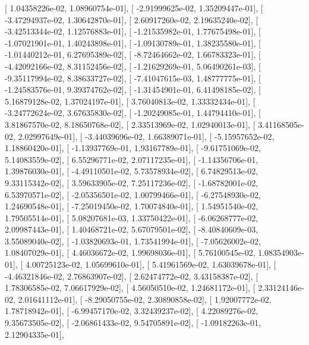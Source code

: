 \documentclass{article}
\begin{document}
       [  1.04358226e-02,   1.08960754e-01],
       [ -2.91999625e-02,   1.35209447e-01],
       [ -3.47294937e-02,   1.30642870e-01],
       [  2.60917260e-02,   2.19635240e-02],
       [ -3.42513344e-02,   1.12576883e-01],
       [ -1.21535982e-01,   1.77675498e-01],
       [ -1.07021901e-01,   1.40243898e-01],
       [ -1.09130789e-01,   1.38235580e-01],
       [ -1.01440212e-01,   6.27695389e-02],
       [ -8.72464662e-02,   1.66783323e-01],
       [ -4.42092166e-02,   8.31152456e-02],
       [ -1.21629269e-01,   5.06490261e-03],
       [ -9.35117994e-02,   8.38633727e-02],
       [ -7.41047615e-03,   1.48777775e-01],
       [ -1.24583576e-01,   9.39374762e-02],
       [ -1.31454901e-01,   6.41498185e-02],
       [  5.16879128e-02,   1.37024197e-01],
       [  3.76040813e-02,   1.33332434e-01],
       [ -3.24772624e-02,   3.67635830e-02],
       [ -1.20249085e-01,   1.44794410e-01],
       [  3.81867570e-02,   8.18650768e-02],
       [  2.33513969e-02,   1.02940013e-01],
       [  3.41168505e-02,   2.02997649e-01],
       [ -3.44039696e-02,   1.66389071e-01],
       [ -5.15957652e-02,   1.18860420e-01],
       [ -1.13937769e-01,   1.93167789e-01],
       [ -9.61751069e-02,   5.14083559e-02],
       [  6.55296771e-02,   2.07117235e-01],
       [ -1.14356706e-01,   1.39876030e-01],
       [ -4.49110501e-02,   5.73578934e-02],
       [  6.74829513e-02,   9.33115342e-02],
       [  3.59633905e-02,   7.25117236e-02],
       [ -1.68782001e-02,   6.53970571e-02],
       [ -2.05356501e-02,   1.00799466e-01],
       [ -6.27548930e-02,   1.24690548e-01],
       [ -7.25019450e-02,   1.70074840e-01],
       [  1.54951540e-02,   1.79505514e-01],
       [  5.08207681e-03,   1.33750422e-01],
       [ -6.06268777e-02,   2.09987443e-01],
       [  1.40468721e-02,   5.67079501e-02],
       [ -8.40840609e-03,   3.55089040e-02],
       [ -1.03820693e-01,   1.73541994e-01],
       [ -7.05626002e-02,   1.08407029e-01],
       [  4.46036672e-02,   1.99698036e-01],
       [  5.76100545e-02,   1.08354903e-01],
       [  4.00725123e-02,   1.05699610e-01],
       [  5.41961569e-02,   1.63039678e-01],
       [ -4.46321846e-02,   2.76863907e-02],
       [  2.62474772e-02,   3.43158387e-02],
       [  1.78306585e-02,   7.06617929e-02],
       [  4.56050510e-02,   1.24681172e-01],
       [  2.33124146e-02,   2.01641112e-01],
       [ -8.29050755e-02,   2.30890858e-02],
       [  1.92007772e-02,   1.78718942e-01],
       [ -6.99457170e-02,   3.32439237e-02],
       [  4.22089276e-02,   9.35673505e-02],
       [ -2.06861433e-02,   9.54705891e-02],
       [ -1.09182263e-01,   2.12904335e-01],
\end{document}
